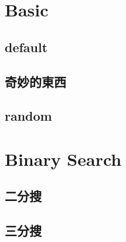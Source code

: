 \documentclass[a4paper,10pt,twocolumn,oneside]{article}
\begin{document}
\pagestyle{fancy}
\fancyfoot{}
\fancyhead[R]{\thepage}
\renewcommand{\headrulewidth}{0.4pt}
\renewcommand{\contentsname}{Contents} 

\newcommand{\includetex}[2]{
  \subsection{#1}
  
  \vspace{-1.2em}
}
\scriptsize
\tableofcontents



\section{Basic}
    \subsection{default}
    

    \subsection{奇妙的東西}
    

    \subsection{random}
    




\section{Binary Search}
    \subsection{二分搜}
    

    \subsection{三分搜}
    
\end{document}
